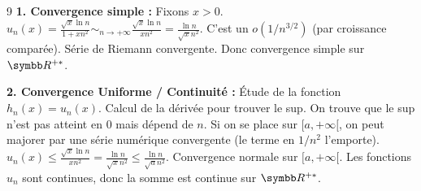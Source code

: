 \begin{correction}{9}
\textbf{1. Convergence simple :}
Fixons $x > 0$. $u_n(x) = \frac{\sqrt{x} \ln n}{1+x n^2} \sim_{n\to+\infty} \frac{\sqrt{x} \ln n}{x n^2} = \frac{\ln n}{\sqrt{x} n^2}$.
C'est un $o(1/n^{3/2})$ (par croissance comparée). Série de Riemann convergente.
Donc convergence simple sur $\R^{+*}$.

\textbf{2. Convergence Uniforme / Continuité :}
Étude de la fonction $h_n(x) = u_n(x)$.
Calcul de la dérivée pour trouver le sup.
On trouve que le sup n'est pas atteint en 0 mais dépend de $n$.
Si on se place sur $[a, +\infty[$, on peut majorer par une série numérique convergente (le terme en $1/n^2$ l'emporte).
$u_n(x) \le \frac{\sqrt{x} \ln n}{x n^2} = \frac{\ln n}{\sqrt{x} n^2} \le \frac{\ln n}{\sqrt{a} n^2}$.
Convergence normale sur $[a, +\infty[$.
Les fonctions $u_n$ sont continues, donc la somme est continue sur $\R^{+*}$.
\end{correction}
